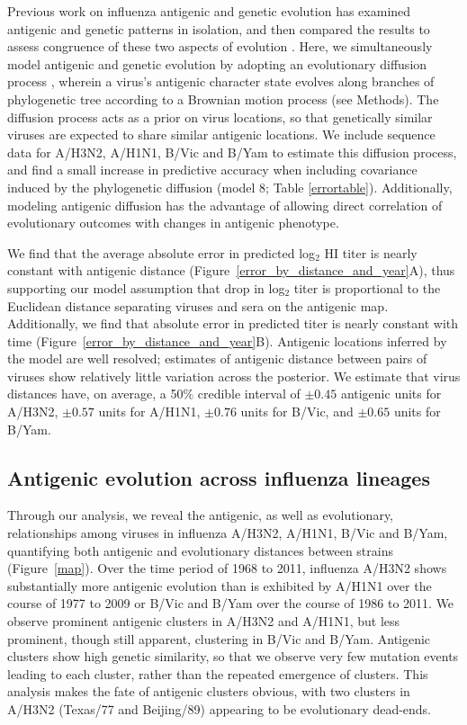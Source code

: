 \documentclass[11pt,oneside,letterpaper]{article}
\begin{document}
Previous work on influenza antigenic and genetic evolution has examined antigenic and genetic patterns in isolation, and then compared the results to assess congruence of these two aspects of evolution \cite{Hay01,Smith04,Russell08}. 
Here, we simultaneously model antigenic and genetic evolution by adopting an evolutionary diffusion process \cite{Lemey10}, wherein a virus's antigenic character state evolves along branches of phylogenetic tree according to a Brownian motion process (see Methods).
The diffusion process acts as a prior on virus locations, so that genetically similar viruses are expected to share similar antigenic locations.
We include sequence data for A/H3N2, A/H1N1, B/Vic and B/Yam to estimate this diffusion process, and find a small increase in predictive accuracy when including covariance induced by the phylogenetic diffusion (model 8; Table \ref{errortable}).
Additionally, modeling antigenic diffusion has the advantage of allowing direct correlation of evolutionary outcomes with changes in antigenic phenotype.

We find that the average absolute error in predicted log$_2$ HI titer is nearly constant with antigenic distance (Figure~\ref{error_by_distance_and_year}A), thus supporting our model assumption that drop in log$_2$ titer is proportional to the Euclidean distance separating viruses and sera on the antigenic map.
Additionally, we find that absolute error in predicted titer is nearly constant with time (Figure~\ref{error_by_distance_and_year}B).
Antigenic locations inferred by the model are well resolved; estimates of antigenic distance between pairs of viruses show relatively little variation across the posterior.
We estimate that virus distances have, on average, a 50\% credible interval of $\pm0.45$ antigenic units for A/H3N2, $\pm0.57$ units for A/H1N1, $\pm0.76$ units for B/Vic, and $\pm0.65$ units for B/Yam.

\subsection*{Antigenic evolution across influenza lineages}

Through our analysis, we reveal the antigenic, as well as evolutionary, relationships among viruses in influenza A/H3N2, A/H1N1, B/Vic and B/Yam, quantifying both antigenic and evolutionary distances between strains (Figure~\ref{map}).
Over the time period of 1968 to 2011, influenza A/H3N2 shows substantially more antigenic evolution than is exhibited by A/H1N1 over the course of 1977 to 2009 or B/Vic and B/Yam over the course of 1986 to 2011.
We observe prominent antigenic clusters in A/H3N2 and A/H1N1, but less prominent, though still apparent, clustering in B/Vic and B/Yam.
Antigenic clusters show high genetic similarity, so that we observe very few mutation events leading to each cluster, rather than the repeated emergence of clusters.
This analysis makes the fate of antigenic clusters obvious, with two clusters in A/H3N2 (Texas/77 and Beijing/89) appearing to be evolutionary dead-ends.
\end{document}
